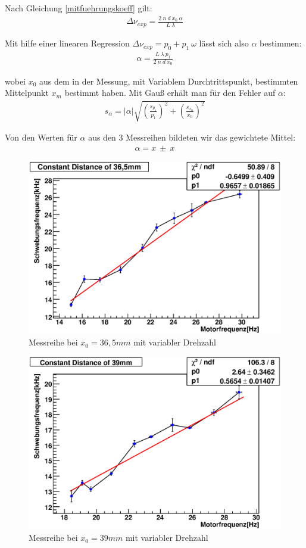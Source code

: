 \documentclass[12pt]{article}
\begin{document}
Nach Gleichung \ref{mitfuehrungskoeff} gilt:
\begin{align}
 \Delta\nu_{exp} = \frac{2 \ n \ d \ x_0 \ \alpha}{L \ \lambda}
\end{align}

Mit hilfe einer linearen Regression $\Delta\nu_{exp} = p_0 + p_1 \ \omega$ lässt sich also $\alpha$ bestimmen:
\begin{align}
 \alpha = \frac{L \ \lambda \ p_1}{2 \ n \ d \ x_0}
\end{align}

wobei $x_0$ aus dem in der Messung, mit Variablem Durchtrittspunkt, bestimmten Mittelpunkt $x_m$ bestimmt haben.
Mit Gauß erhält man für den Fehler auf $\alpha$:
\begin{align}
 s_{\alpha} = \lvert \alpha \rvert \sqrt{\left(\frac{s_{p_1}}{p_1}\right)^2 + \left(\frac{s_{x_0}}{x_0}\right)^2}
\end{align}

Von den Werten für $\alpha$ aus den 3 Messreihen bildeten wir das gewichtete Mittel:
\begin{align}
 \alpha = x \ \pm \ x
\end{align}





\begin{figure}[H]  
\centering
\includegraphics[width=0.7\linewidth]{pictures/36,5mm1.eps}
\caption{Messreihe bei $x_0 = 36,5mm$ mit variabler Drehzahl}
\label{36mm}
\end{figure}

\begin{figure}[H]  
\centering
\includegraphics[width=0.7\linewidth]{pictures/39mm1.eps}
\caption{Messreihe bei $x_0 = 39mm$ mit variabler Drehzahl}
\label{39mmm}
\end{figure}
\end{document}
